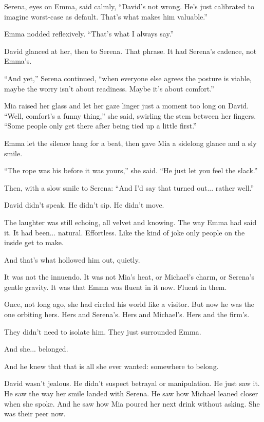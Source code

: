 Serena, eyes on Emma, said calmly, ``David’s not wrong. He’s just calibrated to imagine worst-case 
as default. That’s what makes him valuable.''

Emma nodded reflexively. ``That’s what I always say.''

David glanced at her, then to Serena. That phrase. It had Serena’s cadence, not Emma’s. 

``And yet,'' Serena continued, ``when everyone else agrees the posture is viable, maybe the worry 
isn’t about readiness. Maybe it’s about comfort.''

Mia raised her glass and let her gaze linger just a moment too long on David.
``Well, comfort’s a funny thing,'' she said, swirling the stem between her fingers.
``Some people only get there after being tied up a little first.''

Emma let the silence hang for a beat, then gave Mia a sidelong glance and a sly smile.

``The rope was his before it was yours,'' she said. ``He just let you feel the slack.''

Then, with a slow smile to Serena:
``And I’d say that turned out... rather well.''

David didn’t speak. He didn’t sip. He didn’t move.

The laughter was still echoing, all velvet and knowing. The way Emma had said it. 
It had been... natural. Effortless. Like the kind of joke only people on the 
inside get to make.

And that’s what hollowed him out, quietly.

It was not the innuendo. It was not Mia’s heat, or Michael’s charm, or Serena’s gentle gravity. It was that Emma 
was fluent in it now. Fluent in them.

Once, not long ago, she had circled his world like a visitor. But now he was 
the one orbiting hers. Hers and Serena’s. Hers and Michael’s. Hers and the firm’s.

They didn’t need to isolate him.
They just surrounded Emma.

And she... belonged.

And he knew that that is all she ever wanted: somewhere to belong.

David wasn’t jealous. He didn’t suspect betrayal or manipulation. He just saw it. He saw the 
way her smile landed with Serena. He saw how Michael leaned closer when she spoke. And he saw how Mia 
poured her next drink without asking. She was their peer now. 

